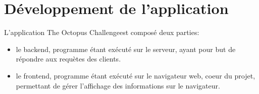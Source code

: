 \documentclass[a4paper,11pt, oneside]{book}
\def\appName{The Octopus Challenge}
\begin{document}
\clearpage
\section{Développement de l'application}


L'application \appName est composé deux parties:
\begin{itemize}
	\item le backend, programme étant exécuté sur le serveur, ayant pour but de répondre aux requètes des clients.
	\item le frontend, programme étant exécuté sur le navigateur web, coeur du projet, permettant de gérer l'affichage des informations sur le navigateur.
\end{itemize}
\end{document}
